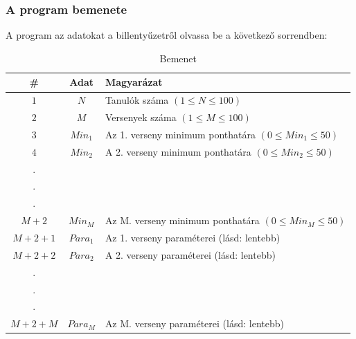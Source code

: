 \documentclass[a4paper]{article}
\begin{document}
      \subsubsection{A program bemenete}
        A program az adatokat a billentyűzetről olvassa be a következő sorrendben:
        \begin{table}[H]
          \centering
          \caption*{Bemenet}
          \begin{tabular}{ccl}
            \toprule
            \# & Adat & Magyarázat \\
            \midrule
            $1$ & $N$ & Tanulók száma $(1 \leqslant N \leqslant 100)$ \\
            $2$ & $M$ & Versenyek száma $(1 \leqslant M \leqslant 100)$ \\
            $3$ & $Min_1$ & Az 1. verseny minimum ponthatára $(0 \leqslant Min_1 \leqslant 50)$ \\
            $4$ & $Min_2$ & A 2. verseny minimum ponthatára $(0 \leqslant Min_2 \leqslant 50)$ \\
            . \\
            . \\
            . \\
            $M+2$ & $Min_M$ & Az M. verseny minimum ponthatára $(0 \leqslant Min_M \leqslant 50)$ \\
            $M+2+1$ & $Para_1$ & Az 1. verseny paraméterei (lásd: lentebb) \\
            $M+2+2$ & $Para_2$ & A 2. verseny paraméterei (lásd: lentebb) \\
            . \\
            . \\
            . \\
            $M+2+M$ & $Para_M$ & Az M. verseny paraméterei (lásd: lentebb) \\
            \bottomrule
          \end{tabular}
        \end{table}
\end{document}
